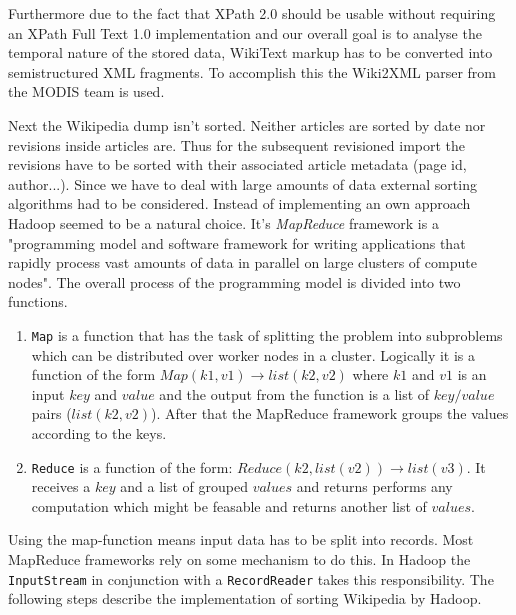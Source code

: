 Furthermore due to the fact that XPath 2.0 should be usable without requiring an XPath Full Text 1.0 implementation and our overall goal is to analyse the temporal nature of the stored data, WikiText markup has to be converted into semistructured XML fragments. To accomplish this the Wiki2XML parser from the MODIS team  is used.

Next the Wikipedia dump isn't sorted. Neither articles are sorted by date nor revisions inside articles are. Thus for the subsequent revisioned import the revisions have to be sorted with their associated article metadata (page id, author...). Since we have to deal with large amounts of data external sorting algorithms had to be considered. Instead of implementing an own approach Hadoop seemed to be a natural choice. It's \emph{MapReduce} framework is a "programming model and software framework for writing applications that rapidly process vast amounts of data in parallel on large clusters of compute nodes". The overall process of the programming model is divided into two functions.

\begin{enumerate}
\item \texttt{Map} is a function that has the task of splitting the problem into subproblems which can be distributed over worker nodes in a cluster. Logically it is a function of the form $Map(k1,v1) \rightarrow list(k2,v2)$ where $k1$ and $v1$ is an input $key$ and $value$ and the output from the function is a list of $key/value$ pairs ($list(k2, v2)$). After that the MapReduce framework groups the values according to the keys.
\item \texttt{Reduce} is a function of the form: $Reduce(k2, list (v2)) \rightarrow list(v3)$. It receives a $key$ and a list of grouped $values$ and returns performs any computation which might be feasable and returns another list of $values$.
\end{enumerate}

Using the map-function means input data has to be split into records. Most MapReduce frameworks rely on some mechanism to do this. In Hadoop the \texttt{InputStream} in conjunction with a \texttt{RecordReader} takes this responsibility. The following steps describe the implementation of sorting Wikipedia by Hadoop.

